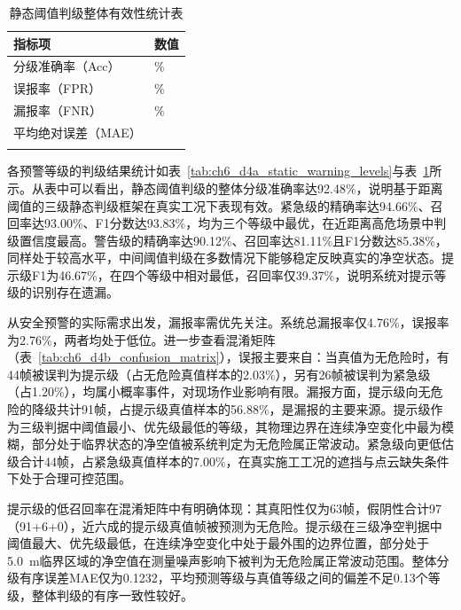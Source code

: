 \begin{table}[htbp]
\centering
\caption{静态阈值判级整体有效性统计表}
\label{tab:ch6_d4a_static_warning_overall}
\begin{tabular*}{0.7\textwidth}{@{\extracolsep{\fill}}>{\centering\arraybackslash}m{5.5cm}>{\centering\arraybackslash}m{3.5cm}}
\Xhline{1pt}
\textbf{指标项} & \textbf{数值} \\
\hline
分级准确率（Acc） & 92.48\% \\
误报率（FPR） & 2.76\% \\
漏报率（FNR） & 4.76\% \\
平均绝对误差（MAE） & 0.1232 \\
\Xhline{1pt}
\end{tabular*}
\end{table}

各预警等级的判级结果统计如表~\ref{tab:ch6_d4a_static_warning_levels}与表~\ref{tab:ch6_d4a_static_warning_overall}所示。从表中可以看出，静态阈值判级的整体分级准确率达92.48\%，说明基于距离阈值的三级静态判级框架在真实工况下表现有效。紧急级的精确率达94.66\%、召回率达93.00\%、F1分数达93.83\%，均为三个等级中最优，在近距离高危场景中判级置信度最高。警告级的精确率达90.12\%、召回率达81.11\%且F1分数达85.38\%，同样处于较高水平，中间阈值判级在多数情况下能够稳定反映真实的净空状态。提示级F1为46.67\%，在四个等级中相对最低，召回率仅39.37\%，说明系统对提示等级的识别存在遗漏。

从安全预警的实际需求出发，漏报率需优先关注。系统总漏报率仅4.76\%，误报率为2.76\%，两者均处于低位。进一步查看混淆矩阵（表~\ref{tab:ch6_d4b_confusion_matrix}），误报主要来自：当真值为无危险时，有44帧被误判为提示级（占无危险真值样本的2.03\%），另有26帧被误判为紧急级（占1.20\%），均属小概率事件，对现场作业影响有限。漏报方面，提示级向无危险的降级共计91帧，占提示级真值样本的56.88\%，是漏报的主要来源。提示级作为三级判据中阈值最小、优先级最低的等级，其物理边界在连续净空变化中最为模糊，部分处于临界状态的净空值被系统判定为无危险属正常波动。紧急级向更低估级合计44帧，占紧急级真值样本的7.00\%，在真实施工工况的遮挡与点云缺失条件下处于合理可控范围。

提示级的低召回率在混淆矩阵中有明确体现：其真阳性仅为63帧，假阴性合计97（91+6+0），近六成的提示级真值帧被预测为无危险。提示级在三级净空判据中阈值最大、优先级最低，在连续净空变化中处于最外围的边界位置，部分处于5.0~m临界区域的净空值在测量噪声影响下被判为无危险属正常波动范围。整体分级有序误差MAE仅为0.1232，平均预测等级与真值等级之间的偏差不足0.13个等级，整体判级的有序一致性较好。

